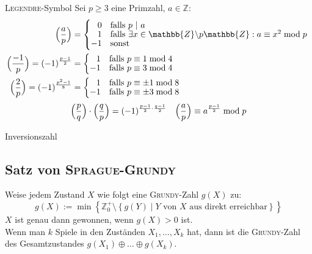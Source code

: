 \begin{algorithm}{\textsc{Legendre}-Symbol}
	Sei $p \geq 3$ eine Primzahl, $a \in \mathbb{Z}$:
	\begin{align*}
		\legendre{a}{p} &=
		\begin{cases*}
		\hphantom{-}0 & falls $p~\vert~a$ \\[-1ex]
		\hphantom{-}1 & falls $\exists x \in \mathbb{Z}\backslash p\mathbb{Z} : a \equiv x^2 \bmod p$ \\[-1ex]
		-1 & sonst
		\end{cases*} \\
		\legendre{-1}{p} = (-1)^{\frac{p - 1}{2}} &=
		\begin{cases*}
		\hphantom{-}1 & falls $p \equiv 1 \bmod 4$ \\[-1ex]
		-1 & falls $p \equiv 3 \bmod 4$
		\end{cases*} \\
		\legendre{2}{p} = (-1)^{\frac{p^2 - 1}{8}} &=
		\begin{cases*}
		\hphantom{-}1 & falls $p \equiv \pm 1 \bmod 8$ \\[-1ex]
		-1 & falls $p \equiv \pm 3 \bmod 8$
		\end{cases*}
	\end{align*}
	\begin{align*}
		\Bigl( \dfrac{p}{q} \Bigr) \cdot \Bigl( \dfrac{q}{p} \Bigr) = (-1)^{\frac{p - 1}{2} \cdot \frac{q - 1}{2}} &&
		\Bigl( \dfrac{a}{p} \Bigr) \equiv a^{\frac{p-1}{2}}\bmod p
	\end{align*}
\end{algorithm}

\begin{algorithm}{Inversionszahl}
\end{algorithm}

\subsection{Satz von \textsc{Sprague-Grundy}}
Weise jedem Zustand $X$ wie folgt eine \textsc{Grundy}-Zahl $g\left(X\right)$ zu:
\[
g\left(X\right) := \min\left\{
\mathbb{Z}_0^+ \setminus
\left\{g\left(Y\right) \mid Y \text{ von } X \text{ aus direkt erreichbar}\right\}
\right\}
\]
$X$ ist genau dann gewonnen, wenn $g\left(X\right) > 0$ ist.\\
Wenn man $k$ Spiele in den Zuständen $X_1, \ldots, X_k$ hat, dann ist die \textsc{Grundy}-Zahl des Gesamtzustandes $g\left(X_1\right) \oplus \ldots \oplus g\left(X_k\right)$.

